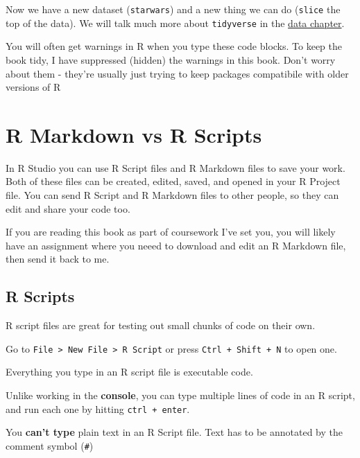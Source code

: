 \documentclass[
]{book}
\begin{document}
Now we have a new dataset (\texttt{starwars}) and a new thing we can do (\texttt{slice} the top of the data). We will talk much more about \texttt{tidyverse} in the \protect\hyperlink{data}{data chapter}.

\begin{hey}
You will often get warnings in R when you type these code blocks. To
keep the book tidy, I have suppressed (hidden) the warnings in this
book. Don't worry about them - they're usually just trying to keep
packages compatibile with older versions of R
\end{hey}

\hypertarget{scripts_rmd}{%
\section{R Markdown vs R Scripts}\label{scripts_rmd}}

In R Studio you can use R Script files and R Markdown files to save your work. Both of these files can be created, edited, saved, and opened in your R Project file. You can send R Script and R Markdown files to other people, so they can edit and share your code too.

If you are reading this book as part of coursework I've set you, you will likely have an assignment where you neeed to download and edit an R Markdown file, then send it back to me.

\hypertarget{r-scripts}{%
\subsection{R Scripts}\label{r-scripts}}

R script files are great for testing out small chunks of code on their own.

Go to \texttt{File\ \textgreater{}\ New\ File\ \textgreater{}\ R\ Script} or press \texttt{Ctrl\ +\ Shift\ +\ N} to open one.

Everything you type in an R script file is executable code.

Unlike working in the \textbf{console}, you can type multiple lines of code in an R script, and run each one by hitting \texttt{ctrl\ +\ enter}.

You \textbf{can't type} plain text in an R Script file. Text has to be annotated by the comment symbol (\texttt{\#})
\end{document}

